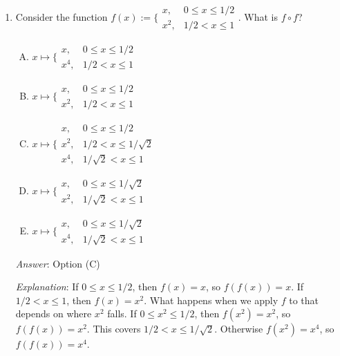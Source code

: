 \documentclass[10pt]{amsart}
\begin{document}
\begin{enumerate}
  {\em Historical note (last year)}: $3$ out of $14$ people got this
  correct. $5$ people chose (E) (indcating that they probably forgot
  the condition that $p < q$), $4$ people chose (C), $3$ people chose
  (B), and $1$ person chose (A).

  {\em Action point}: Review the local behavior heuristics section of
  the review sheet for midterm 2. Or, if this was just a careless
  error about not noting that a particular number was bigger than $1$,
  don't make the careless error again.

\item Consider the function $f(x) := \lbrace\begin{array}{rl}x, & 0
  \le x \le 1/2 \\ x^2, & 1/2 < x \le 1\end{array}$. What is $f \circ f$?

  \begin{enumerate}[(A)]
  \item $x \mapsto \lbrace\begin{array}{rl} x, & 0 \le x \le 1/2\\ x^4, & 1/2 < x \le 1\end{array}$
  \item $x \mapsto \lbrace\begin{array}{rl} x, & 0 \le x \le 1/2\\ x^2, & 1/2 < x \le 1\end{array}$
  \item $x \mapsto \lbrace\begin{array}{rl} x, & 0 \le x \le 1/2\\ x^2, & 1/2 < x \le 1/\sqrt{2}\\ x^4, & 1/\sqrt{2} < x \le 1\end{array}$
  \item $x \mapsto \lbrace \begin{array}{rl} x, & 0 \le x \le 1/\sqrt{2}\\ x^2,& 1/\sqrt{2} < x \le 1\end{array}$
  \item $x \mapsto \lbrace\begin{array}{rl} x, & 0 \le x \le 1/\sqrt{2}\\ x^4, &1/\sqrt{2} < x \le 1\end{array}$
  \end{enumerate}

  {\em Answer}: Option (C)

  {\em Explanation}: If $0 \le x \le 1/2$, then $f(x) = x$, so
  $f(f(x)) = x$. If $1/2 < x \le 1$, then $f(x) = x^2$. What happens
  when we apply $f$ to that depends on where $x^2$ falls. If $0 \le
  x^2 \le 1/2$, then $f(x^2) = x^2$, so $f(f(x)) = x^2$. This covers
  $1/2 < x \le 1/\sqrt{2}$. Otherwise $f(x^2) = x^4$, so $f(f(x)) = x^4$.


\end{enumerate}
\end{document}
